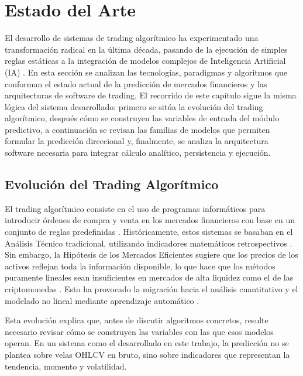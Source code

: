 \chapter{Estado del Arte}
\label{chap:estado_del_arte}

El desarrollo de sistemas de trading algorítmico ha experimentado una transformación radical en la última década, pasando de la ejecución de simples reglas estáticas a la integración de modelos complejos de Inteligencia Artificial (IA) \parencite{treleaven_algorithmic_2013}. En esta sección se analizan las tecnologías, paradigmas y algoritmos que conforman el estado actual de la predicción de mercados financieros y las arquitecturas de software de trading. El recorrido de este capítulo sigue la misma lógica del sistema desarrollado: primero se sitúa la evolución del trading algorítmico, después cómo se construyen las variables de entrada del módulo predictivo, a continuación se revisan las familias de modelos que permiten formular la predicción direccional y, finalmente, se analiza la arquitectura software necesaria para integrar cálculo analítico, persistencia y ejecución.

\section{Evolución del Trading Algorítmico}

El trading algorítmico consiste en el uso de programas informáticos para introducir órdenes de compra y venta en los mercados financieros con base en un conjunto de reglas predefinidas \parencite{chan_algorithmic_2013}. Históricamente, estos sistemas se basaban en el Análisis Técnico tradicional, utilizando indicadores matemáticos retrospectivos \parencite{murphy_technical_1999}. Sin embargo, la Hipótesis de los Mercados Eficientes \parencite{fama_efficient_1970} sugiere que los precios de los activos reflejan toda la información disponible, lo que hace que los métodos puramente lineales sean insuficientes en mercados de alta liquidez como el de las criptomonedas \parencite{katsiampa_volatility_2017}. Esto ha provocado la migración hacia el análisis cuantitativo y el modelado no lineal mediante aprendizaje automático \parencite{lopez_de_prado_advances_2018}.

Esta evolución explica que, antes de discutir algoritmos concretos, resulte necesario revisar cómo se construyen las variables con las que esos modelos operan. En un sistema como el desarrollado en este trabajo, la predicción no se plantea sobre velas OHLCV en bruto, sino sobre indicadores que representan la tendencia, momento y volatilidad.

